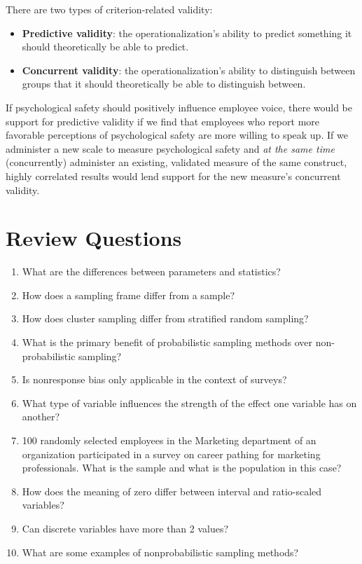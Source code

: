 \documentclass[
]{book}
\providecommand{\tightlist}{%
  \setlength{\itemsep}{0pt}\setlength{\parskip}{0pt}}
\begin{document}
There are two types of criterion-related validity:

\begin{itemize}
\tightlist
\item
  \textbf{Predictive validity}: the operationalization's ability to predict something it should theoretically be able to predict.
\item
  \textbf{Concurrent validity}: the operationalization's ability to distinguish between groups that it should theoretically be able to distinguish between.
\end{itemize}

If psychological safety should positively influence employee voice, there would be support for predictive validity if we find that employees who report more favorable perceptions of psychological safety are more willing to speak up. If we administer a new scale to measure psychological safety and \emph{at the same time} (concurrently) administer an existing, validated measure of the same construct, highly correlated results would lend support for the new measure's concurrent validity.

\hypertarget{review-questions-2}{%
\section{Review Questions}\label{review-questions-2}}

\begin{enumerate}
\def\labelenumi{\arabic{enumi}.}
\item
  What are the differences between parameters and statistics?
\item
  How does a sampling frame differ from a sample?
\item
  How does cluster sampling differ from stratified random sampling?
\item
  What is the primary benefit of probabilistic sampling methods over non-probabilistic sampling?
\item
  Is nonresponse bias only applicable in the context of surveys?
\item
  What type of variable influences the strength of the effect one variable has on another?
\item
  100 randomly selected employees in the Marketing department of an organization participated in a survey on career pathing for marketing professionals. What is the sample and what is the population in this case?
\item
  How does the meaning of zero differ between interval and ratio-scaled variables?
\item
  Can discrete variables have more than 2 values?
\item
  What are some examples of nonprobabilistic sampling methods?
\end{enumerate}
\end{document}
